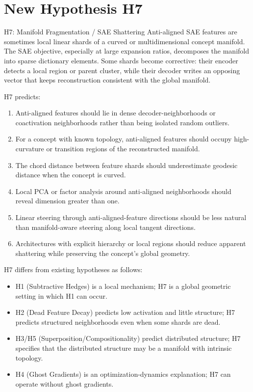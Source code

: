 \documentclass[11pt,a4paper]{article}
\begin{document}
\section{New Hypothesis H7}
\label{sec:h7}

\begin{hypobox}{H7: Manifold Fragmentation / SAE Shattering}
Anti-aligned SAE features are sometimes local linear shards of a curved or multidimensional concept manifold. The SAE objective, especially at large expansion ratios, decomposes the manifold into sparse dictionary elements. Some shards become corrective: their encoder detects a local region or parent cluster, while their decoder writes an opposing vector that keeps reconstruction consistent with the global manifold.
\end{hypobox}

H7 predicts:
\begin{enumerate}[noitemsep]
  \item Anti-aligned features should lie in dense decoder-neighborhoods or coactivation neighborhoods rather than being isolated random outliers.
  \item For a concept with known topology, anti-aligned features should occupy high-curvature or transition regions of the reconstructed manifold.
  \item The chord distance between feature shards should underestimate geodesic distance when the concept is curved.
  \item Local PCA or factor analysis around anti-aligned neighborhoods should reveal dimension greater than one.
  \item Linear steering through anti-aligned-feature directions should be less natural than manifold-aware steering along local tangent directions.
  \item Architectures with explicit hierarchy or local regions should reduce apparent shattering while preserving the concept's global geometry.
\end{enumerate}

H7 differs from existing hypotheses as follows:
\begin{itemize}[noitemsep]
  \item H1 (Subtractive Hedges) is a local mechanism; H7 is a global geometric setting in which H1 can occur.
  \item H2 (Dead Feature Decay) predicts low activation and little structure; H7 predicts structured neighborhoods even when some shards are dead.
  \item H3/H5 (Superposition/Compositionality) predict distributed structure; H7 specifies that the distributed structure may be a manifold with intrinsic topology.
  \item H4 (Ghost Gradients) is an optimization-dynamics explanation; H7 can operate without ghost gradients.
\end{itemize}
\end{document}
